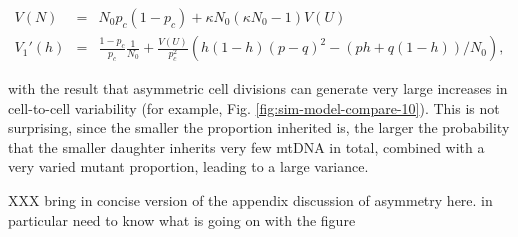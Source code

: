\documentclass{article}
\begin{document}
\begin{eqnarray}
    V(N) & = &N_0 p_c(1-p_c) +\kappa N_0(\kappa N_0-1)V(U) \\
    V_1'(h)& = &\frac{1-p_c}{p_c} \frac{1}{N_0} + \frac{V(U)}{p_c^2} \left( h(1-h) (p-q)^2 - (p h + q(1-h))/N_0 \right),
\end{eqnarray}

with the result that asymmetric cell divisions can generate very large increases in cell-to-cell variability (for example, Fig. \ref{fig:sim-model-compare-10}). This is not surprising, since the smaller the proportion inherited is, the larger the probability that the smaller daughter inherits very few mtDNA in total, combined with a very varied mutant proportion, leading to a large variance.

XXX bring in concise version of the appendix discussion of asymmetry here. in particular need to know what is going on with the figure
\end{document}
